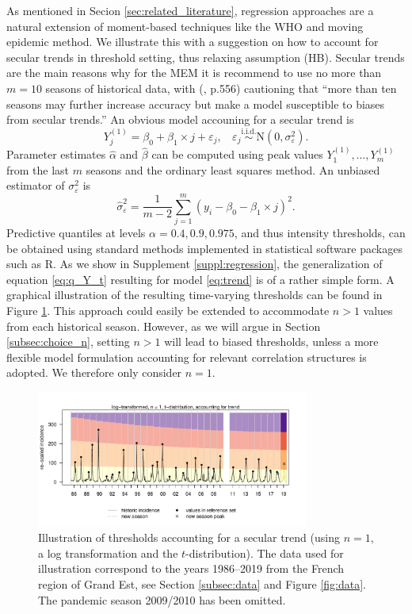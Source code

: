 \documentclass[12pt]{article}
\begin{document}
As mentioned in Secion \ref{sec:related_literature}, regression approaches are a natural extension of moment-based techniques like the WHO and moving epidemic method. We illustrate this with a suggestion on how to account for secular trends in threshold setting, thus relaxing assumption (HB). Secular trends are the main reasons why for the MEM it is recommend to use no more than $m = 10$ seasons of historical data, with \citeauthor{Vega2013} (\citeyear{Vega2013}, p.556) cautioning that ``more than ten seasons may further increase accuracy but make a model susceptible to biases from secular trends.'' An obvious model accouning for a secular trend is
\begin{equation}
Y_j^{(1)} = \beta_0 + \beta_1 \times j + \varepsilon_j, \ \ \ \ \varepsilon_j \stackrel{\text{i.i.d.}}{\sim} \text{N}(0, \sigma^2_\varepsilon).\label{eq:trend}
\end{equation}
Parameter estimates $\hat{\alpha}$ and $\hat{\beta}$ can be computed using peak values $Y_1^{(1)}, \dots, Y_m^{(1)}$ from the last $m$ seasons and the ordinary least squares method. An unbiased estimator of ${\sigma}^2_\varepsilon$ is
$$
\hat{\sigma}^2_\varepsilon = \frac{1}{m - 2} \sum_{j = 1}^m (y_i - \beta_0 - \beta_1 \times j)^2.
$$
Predictive quantiles at levels $\alpha = 0.4, 0.9, 0.975$, and thus intensity thresholds, can be obtained using standard methods implemented in statistical software packages such as R. As we show in Supplement \ref{suppl:regression}, the generalization of equation \eqref{eq:q_Y_t} resulting for model \eqref{eq:trend} is of a rather simple form. A graphical illustration of the resulting time-varying thresholds can be found in Figure \ref{fig:illustration_trend}. This approach could easily be extended to accommodate $n > 1$ values from each historical season. However, as we will argue in Section \ref{subsec:choice_n}, setting $n > 1$ will lead to biased thresholds, unless a more flexible model formulation accounting for relevant correlation structures is adopted. We therefore only consider $n = 1$.

\begin{figure}[h!]
\begin{center}
\includegraphics[width = 0.8\textwidth]{figure/illustration_trend.pdf}
\end{center}
\caption{Illustration of thresholds accounting for a secular trend (using $n = 1$, a log transformation and the $t$-distribution). The data used for illustration correspond to the years 1986--2019 from the French region of Grand Est, see Section \ref{subsec:data} and Figure \ref{fig:data}. The pandemic season 2009/2010 has been omitted.}
\label{fig:illustration_trend}
\end{figure}
\end{document}
